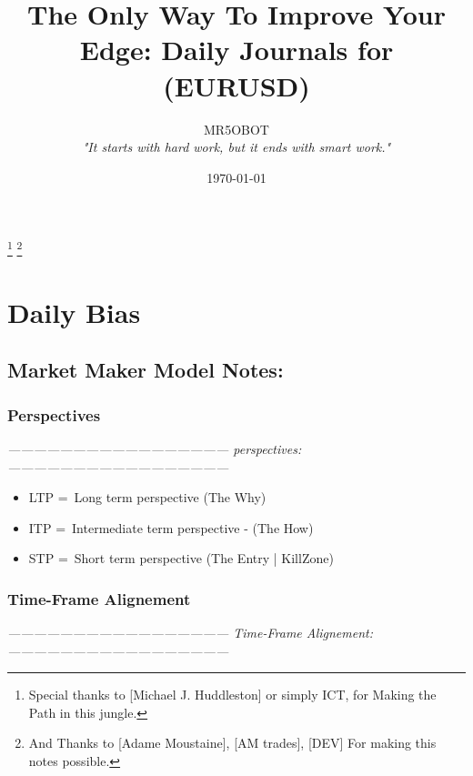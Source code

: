 \documentclass{article}
\title{The Only Way To Improve Your Edge: Daily Journals for (EURUSD)}
\author{MR5OBOT \\ \textit{"It starts with hard work, but it ends with smart work."}}
\date{\today}
\begin{document}
\maketitle
\pagestyle{fancy}
\tableofcontents
\footnote{Special thanks to [Michael J. Huddleston] or simply ICT, for Making the Path in this jungle.}
\footnote{And Thanks to [Adame Moustaine], [AM trades], [DEV] For making this notes possible.}
\newpage

\section{Daily Bias}
\subsection{Market Maker Model Notes:}
\subsubsection{Perspectives}

\begin{center}
  \textit{\---------------------------------------------------- perspectives: \----------------------------------------------------}
\end{center}

\begin{itemize}
   \item LTP =\ Long term perspective (The Why)
    \item ITP =\ Intermediate term perspective - (The How)
    \item STP =\ Short term perspective (The Entry | KillZone)
\end{itemize}

\subsubsection{Time-Frame Alignement} 
  
\begin{center}
  \textit{\---------------------------------------------------- Time-Frame Alignement: \----------------------------------------------------}
\end{center}
\end{document}

